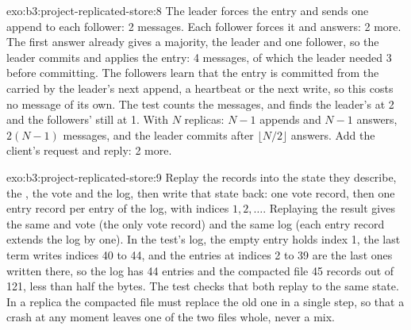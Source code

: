 \begin{solution}{exo:b3:project-replicated-store:8}
The leader forces the entry and sends one append to each follower: 2 messages. Each follower forces it and answers: 2 more. The first answer already gives a majority, the leader and one follower, so the leader commits and applies the entry: 4 messages, of which the leader needed 3 before committing. The followers learn that the entry is committed from the  carried by the leader's next append, a heartbeat or the next write, so this costs no message of its own. The test  counts the messages, and finds the leader's  at 2 and the followers' still at 1. With $N$ replicas: $N - 1$ appends and $N - 1$ answers, $2(N - 1)$ messages, and the leader commits after $\lfloor N/2 \rfloor$ answers. Add the client's request and reply: 2 more.
\end{solution}

\begin{solution}{exo:b3:project-replicated-store:9}
Replay the records into the state they describe, the , the vote and the log, then write that state back: one vote record, then one entry record per entry of the log, with indices $1, 2, \ldots$. Replaying the result gives the same  and vote (the only vote record) and the same log (each entry record extends the log by one). In the test's log, the empty entry holds index 1, the last term writes indices 40 to 44, and the entries at indices 2 to 39 are the last ones written there, so the log has 44 entries and the compacted file 45 records out of 121, less than half the bytes. The test  checks that both replay to the same state. In a replica the compacted file must replace the old one in a single step, so that a crash at any moment leaves one of the two files whole, never a mix.
\end{solution}

